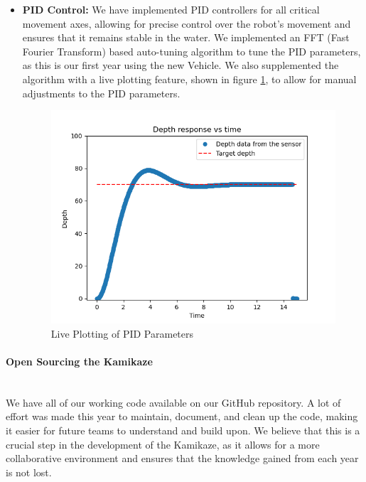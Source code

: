\begin{itemize}[leftmargin=0pt, itemindent=10pt]
    \item \textbf{PID Control:} We have implemented PID controllers for all critical movement axes, allowing for precise control over the robot's movement and ensures that it remains stable in the water. We implemented an FFT (Fast Fourier Transform) based auto-tuning algorithm to tune the PID parameters, as this is our first year using the new Vehicle. We also supplemented the algorithm with a live
    plotting feature, shown in figure \ref{fig:pid_live}, to allow for manual adjustments to the PID parameters.
    \begin{figure}[h]
    \centering
    \includegraphics[width=\columnwidth]{Sections/2Design Rationale/images/Pid.png}
    \caption{Live Plotting of PID Parameters}
    \label{fig:pid_live}
    \end{figure}
\end{itemize}

\vspace{-1cm}
\paragraph{Open Sourcing the Kamikaze} \ \\
We have all of our working code available on our GitHub repository. A lot of effort was made this year to maintain, document, and clean up the code, making it easier for future teams to understand and build upon. We believe that this is a crucial step in the development of the Kamikaze, as it allows for a more collaborative environment and ensures that the knowledge gained from each year is not lost.



